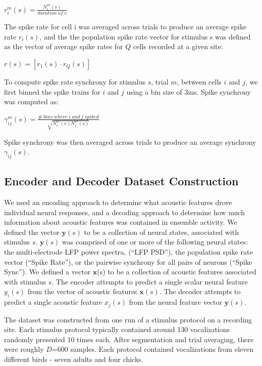 \begin{center}
$r_i^m (s) = \frac{N_i^m (s)}{duration \; of \; s}$
\end{center}

The spike rate for cell i was averaged across trials to produce an average spike rate $r_i (s)$, and the the population spike rate vector for stimulus s was defined as the vector of average spike rates for $Q$ cells recorded at a given site:

\begin{center}
$r(s) = [r_1(s) \cdot r_Q (s)]$
\end{center}

    To compute spike rate synchrony for stimulus $s$, trial $m$, between cells $i$ and $j$, we first binned the spike trains for $i$ and $j$ using a bin size of 3ms. Spike synchrony was computed as:

\begin{center}
$\gamma _{ij} ^m (s)=\frac{\# \; bins\; where\; i\; and \; j\; spiked}{\sqrt{N_i^m(s) N_j^m (s)}}$ 
\end{center}

Spike synchrony was then averaged across trials to produce an average synchrony $\gamma _{ij}(s)$.


\subsection{Encoder and Decoder Dataset Construction}

    We used an encoding approach to determine what acoustic features drove individual neural responses, and a decoding approach to determine how much information about acoustic features was contained in ensemble activity. We defined the vector $\textbf{y}(s)$ to be a collection of neural states, associated with stimulus $s$. $\textbf{y}(s)$ was comprised of one or more of the following neural states: the multi-electrode LFP power spectra, (``LFP PSD''), the population spike rate vector (``Spike Rate''), or the pairwise synchrony for all pairs of neurons (``Spike Sync''). We defined a vector $\textbf{x}$(s) to be a collection of acoustic features associated with stimulus $s$. The encoder attempts to predict a single scalar neural feature $y_i(s)$ from the vector of acoustic features $\textbf{x}(s)$. The decoder attempts to predict a single acoustic feature $x_j (s)$ from the neural feature vector $\textbf{y}(s)$.

The dataset was constructed from one run of a stimulus protocol on a recording site. Each stimulus protocol typically contained around 130 vocalizations randomly presented 10 times each. After segmentation and trial averaging, there were roughly $D$=600 samples. Each protocol contained vocalizations from eleven different birds - seven adults and four chicks. 


